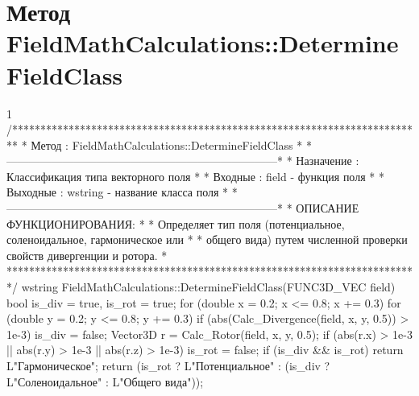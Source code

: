\section{Метод FieldMathCalculations::DetermineFieldClass}
\footnotesize
\begin{listing}{1}
/*************************************************************************
* Метод         : FieldMathCalculations::DetermineFieldClass             *
*------------------------------------------------------------------------*
* Назначение    : Классификация типа векторного поля                     *
* Входные       : field - функция поля                                   *
* Выходные      : wstring - название класса поля                         *
*------------------------------------------------------------------------*
* ОПИСАНИЕ ФУНКЦИОНИРОВАНИЯ:                                             *
* Определяет тип поля (потенциальное, соленоидальное, гармоническое или  *
* общего вида) путем численной проверки свойств дивергенции и ротора.    *
*************************************************************************/
wstring FieldMathCalculations::DetermineFieldClass(FUNC3D_VEC field) {
    bool is_div = true, is_rot = true;
    for (double x = 0.2; x <= 0.8; x += 0.3) {
        for (double y = 0.2; y <= 0.8; y += 0.3) {
            if (abs(Calc_Divergence(field, x, y, 0.5)) > 1e-3) is_div = false;
            Vector3D r = Calc_Rotor(field, x, y, 0.5);
            if (abs(r.x) > 1e-3 || abs(r.y) > 1e-3 || abs(r.z) > 1e-3) 
                is_rot = false;
        }
    }
    if (is_div && is_rot) return L"Гармоническое";
    return (is_rot ? L"Потенциальное" : 
           (is_div ? L"Соленоидальное" : L"Общего вида"));
}
\end{listing}
\normalsize

\pagebreak

